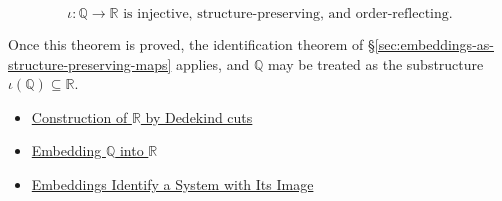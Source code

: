 \begin{remark*}
\[
\iota:\mathbb{Q}\to \mathbb{R} \text{ is injective, structure-preserving, and order-reflecting.}
\]
\end{remark*}
\begin{remark*}[Interpretation]
Once this theorem is proved, the identification theorem of \S\ref{sec:embeddings-as-structure-preserving-maps} applies, and $\mathbb{Q}$ may be treated as the substructure $\iota(\mathbb{Q})\subseteq \mathbb{R}$.
\end{remark*}
\begin{dependencies}
\begin{itemize}
  \item \hyperref[def:reals]{Construction of $\mathbb{R}$ by Dedekind cuts}
  \item \hyperref[def:embedding-q-into-r]{Embedding $\mathbb{Q}$ into $\mathbb{R}$}
  \item \hyperref[thm:embedding-identifies-with-image]{Embeddings Identify a System with Its Image}
\end{itemize}
\end{dependencies}
